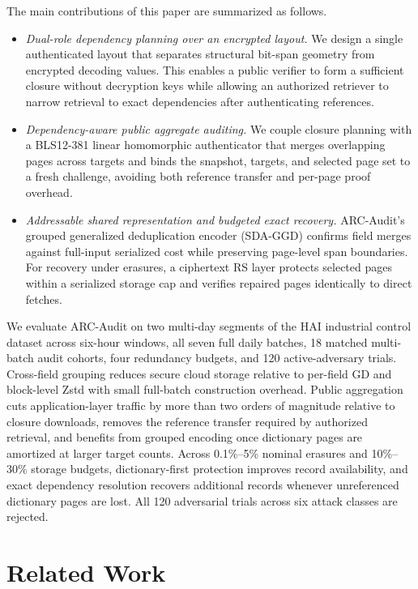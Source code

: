 \documentclass[10pt,journal]{IEEEtran}
\begin{document}
The main contributions of this paper are summarized as follows.
\begin{itemize}
\item \emph{Dual-role dependency planning over an encrypted layout.} We design a single authenticated layout that separates structural bit-span geometry from encrypted decoding values. This enables a public verifier to form a sufficient closure without decryption keys while allowing an authorized retriever to narrow retrieval to exact dependencies after authenticating references.
\item \emph{Dependency-aware public aggregate auditing.} We couple closure planning with a BLS12-381 linear homomorphic authenticator that merges overlapping pages across targets and binds the snapshot, targets, and selected page set to a fresh challenge, avoiding both reference transfer and per-page proof overhead.
\item \emph{Addressable shared representation and budgeted exact recovery.} ARC-Audit's grouped generalized deduplication encoder (SDA-GGD) confirms field merges against full-input serialized cost while preserving page-level span boundaries. For recovery under erasures, a ciphertext RS layer protects selected pages within a serialized storage cap and verifies repaired pages identically to direct fetches.
\end{itemize}

We evaluate ARC-Audit on two multi-day segments of the HAI industrial control dataset across six-hour windows, all seven full daily batches, 18 matched multi-batch audit cohorts, four redundancy budgets, and 120 active-adversary trials. Cross-field grouping reduces secure cloud storage relative to per-field GD and block-level Zstd with small full-batch construction overhead. Public aggregation cuts application-layer traffic by more than two orders of magnitude relative to closure downloads, removes the reference transfer required by authorized retrieval, and benefits from grouped encoding once dictionary pages are amortized at larger target counts. Across 0.1\%--5\% nominal erasures and 10\%--30\% storage budgets, dictionary-first protection improves record availability, and exact dependency resolution recovers additional records whenever unreferenced dictionary pages are lost. All 120 adversarial trials across six attack classes are rejected.
\section{Related Work}
\end{document}
